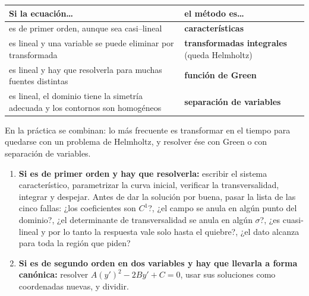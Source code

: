 \documentclass[
  spanish,
  a4paper,
]{scrbook}
\newcounter{none} %
\providecommand{\tightlist}{%
  \setlength{\itemsep}{0pt}\setlength{\parskip}{0pt}}
\theoremstyle{definition}
\theoremstyle{plain}
\theoremstyle{definition}
\theoremstyle{plain}
\theoremstyle{definition}
\theoremstyle{remark}
\begin{document}
{\def\LTcaptype{none} %
\begin{longtable}[]{@{}
  >{\raggedright\arraybackslash}p{}
  >{\raggedright\arraybackslash}p{}@{}}
\toprule\noalign{}
\begin{minipage}[b]{\linewidth}\raggedright
Si la ecuación\ldots{}
\end{minipage} & \begin{minipage}[b]{\linewidth}\raggedright
el método es\ldots{}
\end{minipage} \\
\midrule\noalign{}
\endhead
\bottomrule\noalign{}
\endlastfoot
es de primer orden, aunque sea casi--lineal &
\textbf{características} \\
es lineal y una variable se puede eliminar por transformada &
\textbf{transformadas integrales} (queda Helmholtz) \\
es lineal y hay que resolverla para muchas fuentes distintas &
\textbf{función de Green} \\
es lineal, el dominio tiene la simetría adecuada y los contornos son
homogéneos & \textbf{separación de variables} \\
\end{longtable}
}

En la práctica se combinan: lo más frecuente es transformar en el tiempo
para quedarse con un problema de Helmholtz, y resolver ése con Green o
con separación de variables.

\begin{enumerate}
\def\labelenumi{\arabic{enumi}.}
\setcounter{enumi}{6}
\tightlist
\item
  \textbf{Si es de primer orden y hay que resolverla:} escribir el
  sistema característico, parametrizar la curva inicial, verificar la
  transversalidad, integrar y despejar. Antes de dar la solución por
  buena, pasar la lista de las cinco fallas: ¿los coeficientes son
  \(C^1\)?, ¿el campo se anula en algún punto del dominio?, ¿el
  determinante de transversalidad se anula en algún \(\sigma\)?, ¿es
  cuasi-lineal y por lo tanto la respuesta vale solo hasta el quiebre?,
  ¿el dato alcanza para toda la región que piden?
\item
  \textbf{Si es de segundo orden en dos variables y hay que llevarla a
  forma canónica:} resolver \(A(y')^2 - 2By' + C = 0\), usar sus
  soluciones como coordenadas nuevas, y dividir.
\end{enumerate}
\end{document}
